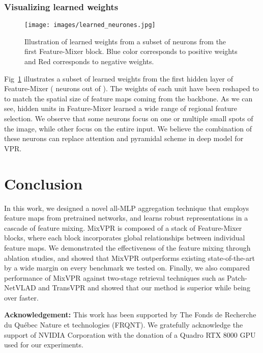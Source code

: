 \documentclass[10pt,twocolumn,letterpaper]{article}
\begin{document}
\subsubsection{Visualizing learned weights}
\begin{figure}
\begin{center}
\texttt{[image: images/learned\_neurones.jpg]}
\end{center}
   \caption{Illustration of learned weights from a subset of  neurons from the first Feature-Mixer block. Blue color corresponds to positive weights and Red corresponds to negative weights.}
\label{fig:neurones}
\end{figure}
Fig~\ref{fig:neurones} illustrates a subset of learned weights from the first hidden layer of Feature-Mixer ( neurons out of ). The weights of each unit have been reshaped to  to match the spatial size of feature maps coming from the backbone. As we can see, hidden units in Feature-Mixer learned a wide range of regional feature selection. We observe that some neurons focus on one or multiple small spots of the image, while other focus on the entire input. We believe the combination of these neurons can replace attention and pyramidal scheme in deep model for VPR. 





\section{Conclusion}
In this work, we designed a novel all-MLP aggregation technique that employs feature maps from pretrained networks, and learns robust representations in a cascade of feature mixing. MixVPR is composed of a stack of Feature-Mixer blocks, where each block incorporates global relationships between individual feature maps. We demonstrated the effectiveness of the feature mixing through ablation studies, and showed that MixVPR outperforms existing state-of-the-art by a wide margin on every benchmark we tested on. Finally, we also compared performance of MixVPR against two-stage retrieval techniques such as Patch-NetVLAD and TransVPR and showed that our method is superior while being over  faster.

\vspace{5pt}
\noindent\textbf{Acknowledgement:} This work has been supported by The Fonds de Recherche du Québec Nature et technologies (FRQNT). We gratefully acknowledge the support of NVIDIA Corporation with the donation of a Quadro RTX 8000 GPU used for our experiments.

{\small


}
\end{document}
